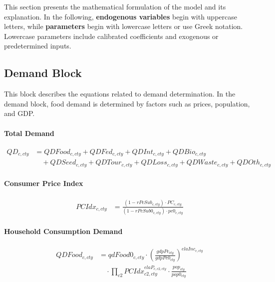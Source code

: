 This section presents the mathematical formulation of the model and its explanation.  
In the following, \textbf{endogenous variables} begin with uppercase letters,
while \textbf{parameters} begin with lowercase letters or use Greek notation.
Lowercase parameters include calibrated coefficients and exogenous or predetermined inputs.

\subsection{Demand Block}
This block describes the equations related to demand determination.  
In the demand block, food demand is determined by factors such as prices, population, and GDP.

\paragraph{Total Demand}
\begin{align}
  QD_{c,cty}
  &= QDFood_{c,cty} + QDFed_{c,cty} + QDInt_{c,cty} + QDBio_{c,cty} \nonumber\\
  &\quad + QDSeed_{c,cty} + QDTour_{c,cty} + QDLoss_{c,cty}
    + QDWaste_{c,cty} + QDOth_{c,cty}
  \tag{QDEq}\label{eq:QDEq}
\end{align}

\paragraph{Consumer Price Index}
\begin{align}
  PCIdx_{c,cty}
  &= \frac{(1-rPcSub_{c,cty})\cdot PC_{c,cty}}
           {(1-rPcSub0_{c,cty})\cdot pc0_{c,cty}}
  \tag{PCIdxEq}\label{eq:PCIdxEq}
\end{align}

\paragraph{Household Consumption Demand}
\begin{align}
  QDFood_{c,cty}
  &= qdFood0_{c,cty}
     \cdot
     \left(\frac{gdpPc_{cty}}{gdpPc0_{cty}}\right)^{elaInc_{c,cty}}
     \nonumber\\
  &\quad \cdot
     \prod_{c2}\!
     PCIdx_{c2,cty}^{elaP_{c,c2,cty}}
     \cdot
     \frac{pop_{cty}}{pop0_{cty}}
  \tag{QDFoodEq}\label{eq:QDFoodEq}
\end{align}

